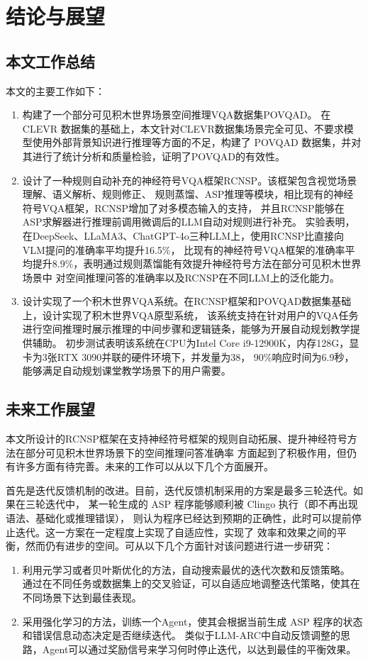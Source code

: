\chapter{结论与展望}
\section{本文工作总结}
本文的主要工作如下：
\begin{enumerate}[nosep]
\item 构建了一个部分可见积木世界场景空间推理VQA数据集POVQAD。
在 CLEVR 数据集的基础上，本文针对CLEVR数据集场景完全可见、不要求模型使用外部背景知识进行推理等方面的不足，构建了 POVQAD 数据集，并对其进行了统计分析和质量检验，证明了POVQAD的有效性。
\item 设计了一种规则自动补充的神经符号VQA框架RCNSP。该框架包含视觉场景理解、语义解析、规则修正、
规则蒸馏、ASP推理等模块，相比现有的神经符号VQA框架，RCNSP增加了对多模态输入的支持，
并且RCNSP能够在ASP求解器进行推理前调用微调后的LLM自动对规则进行补充。
实验表明，在DeepSeek、LLaMA3、ChatGPT-4o三种LLM上，使用RCNSP比直接向VLM提问的准确率平均提升16.5\%，
比现有的神经符号VQA框架的准确率平均提升8.9\%，表明通过规则蒸馏能有效提升神经符号方法在部分可见积木世界场景中
对空间推理问答的准确率以及RCNSP在不同LLM上的泛化能力。
\item 设计实现了一个积木世界VQA系统。在RCNSP框架和POVQAD数据集基础上，设计实现了积木世界VQA原型系统，
该系统支持在针对用户的VQA任务进行空间推理时展示推理的中间步骤和逻辑链条，能够为开展自动规划教学提供辅助。
初步测试表明该系统在CPU为Intel Core i9-12900K，内存128G，显卡为3张RTX 3090并联的硬件环境下，并发量为38，
90\%响应时间为6.9秒，能够满足自动规划课堂教学场景下的用户需要。
\end{enumerate}
\section{未来工作展望}
本文所设计的RCNSP框架在支持神经符号框架的规则自动拓展、提升神经符号方法在部分可见积木世界场景下的空间推理问答准确率
方面起到了积极作用，但仍有许多方面有待完善。未来的工作可以从以下几个方面展开。

首先是迭代反馈机制的改进。目前，迭代反馈机制采用的方案是最多三轮迭代。如果在三轮迭代中，
某一轮生成的 ASP 程序能够顺利被 Clingo 执行（即不再出现语法、基础化或推理错误），
则认为程序已经达到预期的正确性，此时可以提前停止迭代。这一方案在一定程度上实现了自适应性，实现了
效率和效果之间的平衡，然而仍有进步的空间。可从以下几个方面针对该问题进行进一步研究：
\begin{enumerate}[nosep]
    \item 利用元学习或者贝叶斯优化的方法，自动搜索最优的迭代次数和反馈策略。
通过在不同任务或数据集上的交叉验证，可以自适应地调整迭代策略，使其在不同场景下达到最佳表现。
    \item 采用强化学习的方法，训练一个Agent，使其会根据当前生成 ASP 程序的状态和错误信息动态决定是否继续迭代。
类似于LLM-ARC中自动反馈调整的思路，Agent可以通过奖励信号来学习何时停止迭代，以达到最佳的平衡效果\cite{kalyanpur2024llmarcenhancingllmsautomated}。
\end{enumerate}


